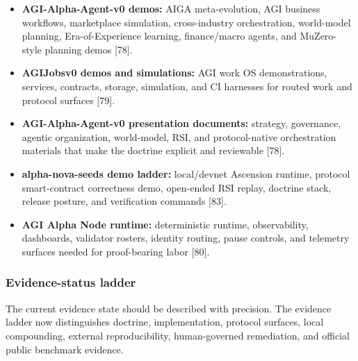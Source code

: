 \begin{itemize}
\tightlist
\item
  \textbf{AGI-Alpha-Agent-v0 demos:} AIGA meta-evolution, AGI business
  workflows, marketplace simulation, cross-industry orchestration,
  world-model planning, Era-of-Experience learning, finance/macro
  agents, and MuZero-style planning demos {[}78{]}.
\item
  \textbf{AGIJobsv0 demos and simulations:} AGI work OS demonstrations,
  services, contracts, storage, simulation, and CI harnesses for routed
  work and protocol surfaces {[}79{]}.
\item
  \textbf{AGI-Alpha-Agent-v0 presentation documents:} strategy,
  governance, agentic organization, world-model, RSI, and
  protocol-native orchestration materials that make the doctrine
  explicit and reviewable {[}78{]}.
\item
  \textbf{alpha-nova-seeds demo ladder:} local/devnet Ascension runtime,
  protocol smart-contract correctness demo, open-ended RSI replay,
  doctrine stack, release posture, and verification commands {[}83{]}.
\item
  \textbf{AGI Alpha Node runtime:} deterministic runtime, observability,
  dashboards, validator rosters, identity routing, pause controls, and
  telemetry surfaces needed for proof-bearing labor {[}80{]}.
\end{itemize}

\subsubsection{Evidence-status ladder}\label{evidence-status-ladder}

The current evidence state should be described with precision. The
evidence ladder now distinguishes doctrine, implementation, protocol
surfaces, local compounding, external reproducibility, human-governed
remediation, and official public benchmark evidence.

